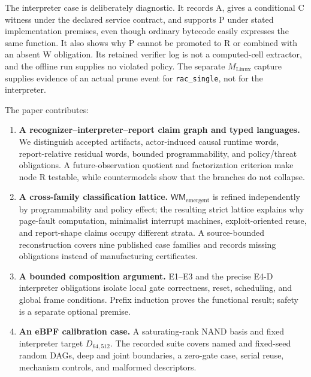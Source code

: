 \documentclass[conference]{IEEEtran}
\begin{document}
The interpreter case is deliberately diagnostic. It records A, gives a conditional C witness under the declared service contract, and supports P under stated implementation premises, even though ordinary bytecode easily expresses the same function. It also shows why P cannot be promoted to R or combined with an absent W obligation. Its retained verifier log is not a computed-cell extractor, and the offline run supplies no violated policy. The separate $M_{\mathrm{Linux}}$ capture supplies evidence of an actual prune event for \texttt{rac\_single}, not for the interpreter.

The paper contributes:

\begin{enumerate}
\item \textbf{A recognizer--interpreter--report claim graph and typed languages.} We distinguish accepted artifacts, actor-induced causal runtime words, report-relative residual words, bounded programmability, and policy/threat obligations. A future-observation quotient and factorization criterion make node R testable, while countermodels show that the branches do not collapse.

\item \textbf{A cross-family classification lattice.} $\mathsf{WM}_{\mathrm{emergent}}$ is refined independently by programmability and policy effect; the resulting strict lattice explains why page-fault computation, minimalist interrupt machines, exploit-oriented reuse, and report-shape claims occupy different strata. A source-bounded reconstruction covers nine published case families and records missing obligations instead of manufacturing certificates.

\item \textbf{A bounded composition argument.} E1--E3 and the precise E4-D interpreter obligations isolate local gate correctness, reset, scheduling, and global frame conditions. Prefix induction proves the functional result; safety is a separate optional premise.

\item \textbf{An eBPF calibration case.} A saturating-rank NAND basis and fixed interpreter target $D_{64,512}$. The recorded suite covers named and fixed-seed random DAGs, deep and joint boundaries, a zero-gate case, serial reuse, mechanism controls, and malformed descriptors.


\end{enumerate}
\end{document}
